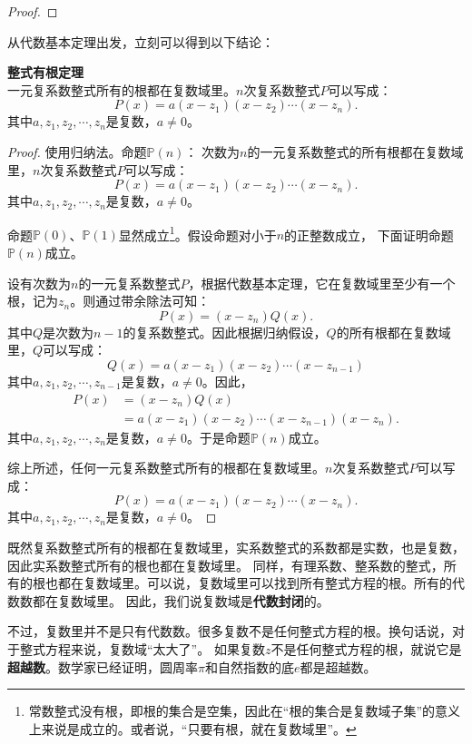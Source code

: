 \documentclass[12pt,UTF8]{ctexbook}
\begin{document}
\begin{appendix}
\begin{proof}
\end{proof}

从代数基本定理出发，立刻可以得到以下结论：

\begin{tm}{\textbf{整式有根定理}}
    \mbox{} \\
    \indent 一元复系数整式所有的根都在复数域里。$n$次复系数整式$P$可以写成：
    $$ P(x) = a(x - z_1)(x - z_2)\cdots(x - z_n).$$
    其中$a, z_1, z_2,\cdots, z_n$是复数，$a\neq 0$。   
\end{tm}

\begin{proof}
    使用归纳法。命题$\mathbb{P}(n)$：
    次数为$n$的一元复系数整式的所有根都在复数域里，$n$次复系数整式$P$可以写成：
    $$ P(x) = a(x - z_1)(x - z_2)\cdots(x - z_n).$$
    其中$a, z_1, z_2,\cdots, z_n$是复数，$a\neq 0$。 

    命题$\mathbb{P}(0)$、$\mathbb{P}(1)$显然成立\footnote{常数整式没有根，即根的集合是空集，因此在“根的集合是复数域子集”的意义上来说是成立的。或者说，“只要有根，就在复数域里”。}。假设命题对小于$n$的正整数成立，
    下面证明命题$\mathbb{P}(n)$成立。

    设有次数为$n$的一元复系数整式$P$，根据代数基本定理，它在复数域里至少有一个根，记为$z_n$。则通过带余除法可知：
    $$ P(x) = (x - z_n)Q(x).$$
    其中$Q$是次数为$n-1$的复系数整式。因此根据归纳假设，$Q$的所有根都在复数域里，$Q$可以写成：
    $$ Q(x) = a(x - z_1)(x - z_2)\cdots(x - z_{n-1})$$
    其中$a, z_1, z_2,\cdots, z_{n-1}$是复数，$a\neq 0$。因此，
    \begin{align*} 
        P(x) &= (x - z_n)Q(x) \\
        &= a(x - z_1)(x - z_2)\cdots(x - z_{n-1})(x - z_n).
    \end{align*}
    其中$a, z_1, z_2,\cdots, z_n$是复数，$a\neq 0$。于是命题$\mathbb{P}(n)$成立。

    综上所述，任何一元复系数整式所有的根都在复数域里。$n$次复系数整式$P$可以写成：
    $$ P(x) = a(x - z_1)(x - z_2)\cdots(x - z_n).$$
    其中$a, z_1, z_2,\cdots, z_n$是复数，$a\neq 0$。 

\end{proof}

既然复系数整式所有的根都在复数域里，实系数整式的系数都是实数，也是复数，因此实系数整式所有的根也都在复数域里。
同样，有理系数、整系数的整式，所有的根也都在复数域里。可以说，复数域里可以找到所有整式方程的根。所有的代数数都在复数域里。
因此，我们说复数域是\textbf{代数封闭}的。

不过，复数里并不是只有代数数。很多复数不是任何整式方程的根。换句话说，对于整式方程来说，复数域“太大了”。
如果复数$z$不是任何整式方程的根，就说它是\textbf{超越数}。数学家已经证明，圆周率$\pi$和自然指数的底$e$都是超越数。


\end{appendix}
\end{document}
